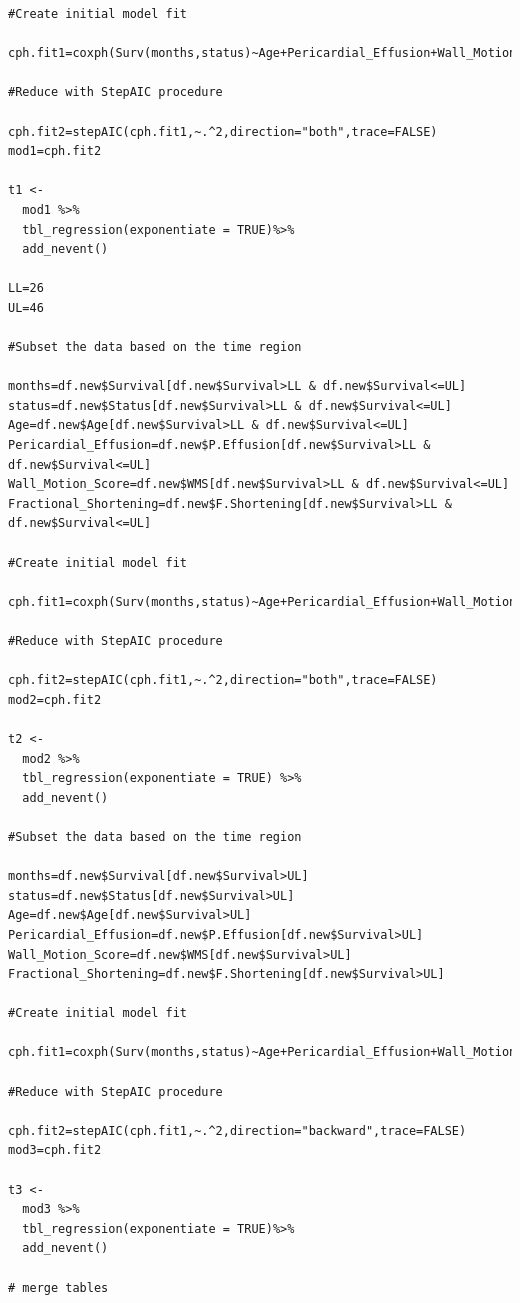 \documentclass[
]{article}
\begin{document}
\begin{verbatim}
#Create initial model fit

cph.fit1=coxph(Surv(months,status)~Age+Pericardial_Effusion+Wall_Motion_Score+Fractional_Shortening,x=T)

#Reduce with StepAIC procedure

cph.fit2=stepAIC(cph.fit1,~.^2,direction="both",trace=FALSE)
mod1=cph.fit2

t1 <-
  mod1 %>%
  tbl_regression(exponentiate = TRUE)%>%
  add_nevent()

LL=26
UL=46

#Subset the data based on the time region 

months=df.new$Survival[df.new$Survival>LL & df.new$Survival<=UL]
status=df.new$Status[df.new$Survival>LL & df.new$Survival<=UL]
Age=df.new$Age[df.new$Survival>LL & df.new$Survival<=UL]
Pericardial_Effusion=df.new$P.Effusion[df.new$Survival>LL & df.new$Survival<=UL]
Wall_Motion_Score=df.new$WMS[df.new$Survival>LL & df.new$Survival<=UL]
Fractional_Shortening=df.new$F.Shortening[df.new$Survival>LL & df.new$Survival<=UL]

#Create initial model fit

cph.fit1=coxph(Surv(months,status)~Age+Pericardial_Effusion+Wall_Motion_Score+Fractional_Shortening,x=T)

#Reduce with StepAIC procedure

cph.fit2=stepAIC(cph.fit1,~.^2,direction="both",trace=FALSE)
mod2=cph.fit2

t2 <-
  mod2 %>%
  tbl_regression(exponentiate = TRUE) %>%
  add_nevent()

#Subset the data based on the time region 

months=df.new$Survival[df.new$Survival>UL]
status=df.new$Status[df.new$Survival>UL]
Age=df.new$Age[df.new$Survival>UL]
Pericardial_Effusion=df.new$P.Effusion[df.new$Survival>UL]
Wall_Motion_Score=df.new$WMS[df.new$Survival>UL]
Fractional_Shortening=df.new$F.Shortening[df.new$Survival>UL]

#Create initial model fit

cph.fit1=coxph(Surv(months,status)~Age+Pericardial_Effusion+Wall_Motion_Score+Fractional_Shortening,x=T)

#Reduce with StepAIC procedure

cph.fit2=stepAIC(cph.fit1,~.^2,direction="backward",trace=FALSE)
mod3=cph.fit2

t3 <-
  mod3 %>%
  tbl_regression(exponentiate = TRUE)%>%
  add_nevent()

# merge tables 


\end{verbatim}
\end{document}
